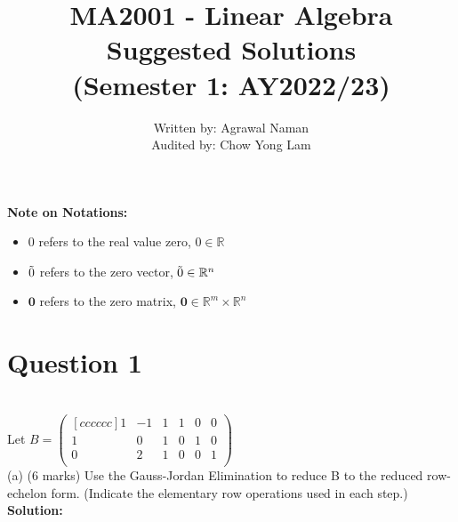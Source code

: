 \documentclass{article}
\title{%
  MA2001 - Linear Algebra Suggested Solutions  \\ 
  \large (Semester 1: AY2022/23) \\ }
\author{%
  \large
    Written by: Agrawal Naman \\
    Audited by: Chow Yong Lam}
\date{}
\begin{document}
\maketitle %

\begin{tcolorbox}
\textbf{Note on Notations:}
\begin{itemize}
    \item $0$ refers to the real value zero, $0 \in \mathbb{R}$
    \item $\Tilde{0}$ refers to the zero vector, $\Tilde{0} \in \mathbb{R}^n$
    \item $\bm{0}$ refers to the zero matrix, $\bm{0} \in \mathbb{R}^m \times \mathbb{R}^n$
\end{itemize}
\end{tcolorbox}

\section*{Question 1}
\newline
\\ Let
$
B=
            \begin{pmatrix}[cccccc]
                1 & -1 & 1 & 1 & 0 & 0 \\
                1 & 0 & 1 & 0 & 1 & 0 \\
                0 & 2 & 1 & 0 & 0 & 1 \\ 
            \end{pmatrix}
$ 
\newline
\\ (a)  (6 marks) Use the Gauss-Jordan Elimination to reduce B to the reduced row-echelon form. (Indicate the elementary row operations used in each step.)
\newline
\textbf{Solution:}
\end{document}
